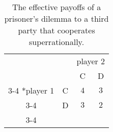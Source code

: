 \begin{table}[h!]
    \centering
    \setlength{\extrarowheight}{2pt}
    \begin{tabular}{cc|c|c|}
      & \multicolumn{1}{c}{} & \multicolumn{2}{c}{player 2}\\
      & \multicolumn{1}{c}{} & \multicolumn{1}{c}{C}  & \multicolumn{1}{c}{D} \\\cline{3-4}
      \multirow{2}*{player 1}  & C & $\,\,4\,\,$ & $3$ \\\cline{3-4}
      						   & D & $\,\,3\,\,$ & $2$ \\\cline{3-4}
    \end{tabular}
    \caption{The effective payoffs of a prisoner's dilemma to a third party that cooperates
superrationally.}
    \label{PD-payoff-matrix-superrational-third-party}
\end{table}

